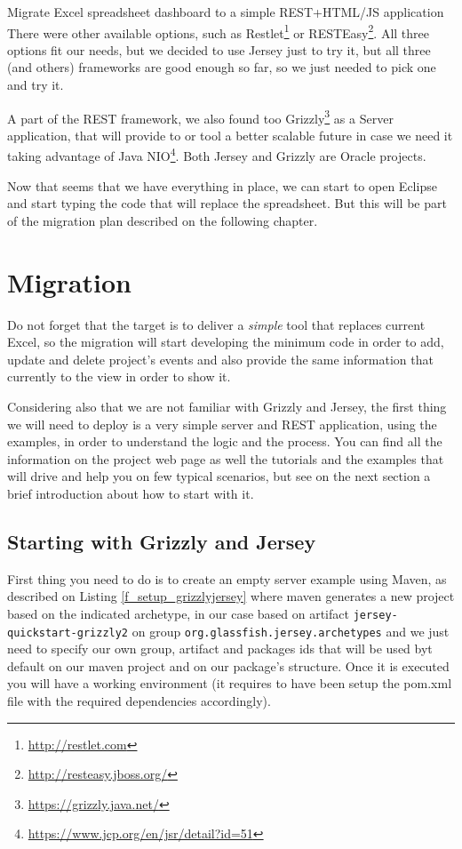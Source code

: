 \begin{part}{Migrate Excel spreadsheet dashboard to a simple REST+HTML/JS
application}
There were other available options, such as
Restlet\footnote{\url{http://restlet.com}} or
RESTEasy\footnote{\url{http://resteasy.jboss.org/}}. All three options fit our
needs, but we decided to use Jersey just to try it, but all three (and others)
frameworks are good enough so far, so we just needed to pick one and try it.

A part of the REST framework, we also found too Grizzly\footnote{\url{https://grizzly.java.net/}} as a Server application, that will
provide to or tool a better scalable future in case we need it taking
advantage of Java NIO\footnote{\url{https://www.jcp.org/en/jsr/detail?id=51}}.
Both Jersey and Grizzly are Oracle projects.

Now that seems that we have everything in place, we can start to open Eclipse
and start typing the code that will replace the spreadsheet. But this will be
part of the migration plan described on the following chapter.

\chapter{Migration}
Do not forget that the target is to deliver a \emph{simple} tool that replaces
current Excel, so the migration will start developing the minimum code in order
to add, update and delete project's events and also provide the same
information that currently to the view in order to show it.

Considering also that we are not familiar with Grizzly and Jersey, the first
thing we will need to deploy is a very simple server and REST application,
using the examples, in order to understand the logic and the process. You can find all the
information on the project web page as well the tutorials and the examples that
will drive and help you on few typical scenarios, but see on the next section a
brief introduction about how to start with it.

\section{Starting with Grizzly and Jersey}
First thing you need to do is to create an empty server example using Maven,
as described on Listing \ref{f_setup_grizzlyjersey} where maven generates a new
project based on the indicated archetype, in our case based on artifact
\texttt{jersey-quickstart-grizzly2} on group
\texttt{org.glassfish.jersey.archetypes} and we just need to specify our own
group, artifact and packages ids that will be used byt default on our maven
project and on our package's structure. Once it is executed you will have a
working environment (it requires to have been setup the pom.xml file with the required dependencies accordingly).\\


\end{part}
